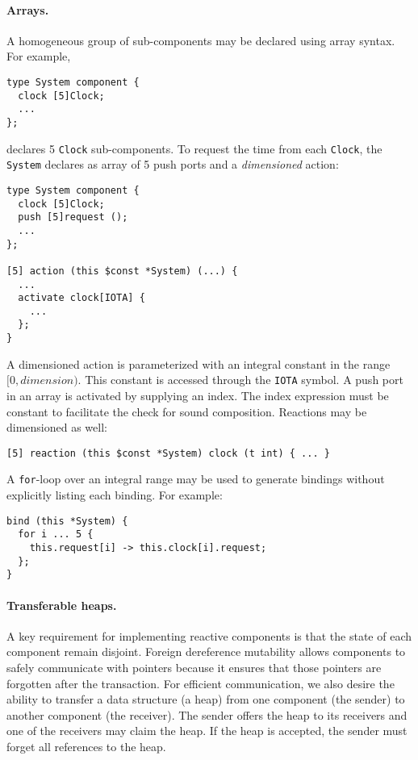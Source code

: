 \paragraph{Arrays.}
A homogeneous group of sub-components may be declared using array syntax.
For example,
\begin{verbatim}
type System component {
  clock [5]Clock;
  ...
};
\end{verbatim}
declares 5 \verb+Clock+ sub-components.
To request the time from each \verb+Clock+, the \verb+System+ declares as array of 5 push ports and a \emph{dimensioned} action:
\begin{verbatim}
type System component {
  clock [5]Clock;
  push [5]request ();
  ...
};

[5] action (this $const *System) (...) {
  ...
  activate clock[IOTA] {
    ...
  };
}
\end{verbatim}
A dimensioned action is parameterized with an integral constant in the range $[0,dimension)$.
This constant is accessed through the \verb+IOTA+ symbol.
A push port in an array is activated by supplying an index.
The index expression must be constant to facilitate the check for sound composition.
Reactions may be dimensioned as well:
\begin{verbatim}
[5] reaction (this $const *System) clock (t int) { ... }
\end{verbatim}
A \verb+for+-loop over an integral range may be used to generate bindings without explicitly listing each binding.
For example:
\begin{verbatim}
bind (this *System) {
  for i ... 5 {
    this.request[i] -> this.clock[i].request;
  };
}
\end{verbatim}

\paragraph{Transferable heaps.}
A key requirement for implementing reactive components is that the state of each component remain disjoint.
Foreign dereference mutability allows components to safely communicate with pointers because it ensures that those pointers are forgotten after the transaction.
For efficient communication, we also desire the ability to transfer a data structure (a heap) from one component (the sender) to another component (the receiver).
The sender offers the heap to its receivers and one of the receivers may claim the heap.
If the heap is accepted, the sender must forget all references to the heap.

